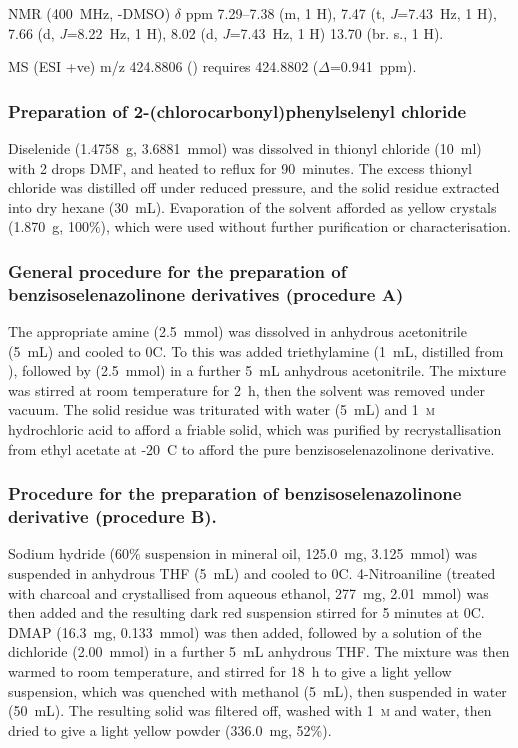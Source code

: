 \begin{refsection}
 NMR (400~MHz, -DMSO) $\delta$ ppm
7.29--7.38 (m, 1 H),
7.47 (t, \emph{J}=7.43~Hz, 1 H),
7.66 (d, \emph{J}=8.22~Hz, 1 H),
8.02 (d, \emph{J}=7.43~Hz, 1 H)
13.70 (br. s., 1 H).

MS (ESI +ve) m/z 424.8806 ()  requires 424.8802 ($\Delta$=0.941~ppm).

\subsubsection[Preparation of \refcmpd{dichloride}]{Preparation of 2-(chlorocarbonyl)phenylselenyl chloride }
Diselenide  (1.4758~g, 3.6881~mmol) was dissolved in thionyl chloride (10~ml) with 2 drops DMF, and heated to reflux for 90~minutes.
The excess thionyl chloride was distilled off under reduced pressure, and the solid residue extracted into dry hexane (30~mL).
Evaporation of the solvent afforded  as yellow crystals (1.870~g, 100\%), which were used without further purification or characterisation.

\subsubsection[General procedure A]{General procedure for the preparation of benzisoselenazolinone derivatives  (procedure A)}
The appropriate amine (2.5~mmol) was dissolved in anhydrous acetonitrile (5~mL) and cooled to 0\degree C.
To this was added triethylamine (1~mL, distilled from ), followed by  (2.5~mmol) in a further 5~mL anhydrous acetonitrile.
The mixture was stirred at room temperature for 2~h, then the solvent was removed under vacuum.
The solid residue was triturated with water (5~mL) and 1~\textsc{m} hydrochloric acid to afford a friable solid, which was purified by recrystallisation from ethyl acetate at -20\degree~C to afford the pure benzisoselenazolinone derivative.

\subsubsection[General procedure B]{Procedure for the preparation of benzisoselenazolinone derivative  (procedure B).}
Sodium hydride (60\% suspension in mineral oil, 125.0~mg, 3.125~mmol) was suspended in anhydrous THF (5~mL) and cooled to 0\degree C.
4-Nitroaniline (treated with charcoal and crystallised from aqueous ethanol, 277~mg, 2.01~mmol) was then added and the resulting dark red suspension stirred for 5 minutes at 0\degree C.
DMAP (16.3~mg, 0.133~mmol) was then added, followed by a solution of the dichloride  (2.00~mmol) in a further 5~mL anhydrous THF.
The mixture was then warmed to room temperature, and stirred for 18~h to give a light yellow suspension, which was quenched with methanol (5~mL), then suspended in water (50~mL).
The resulting solid was filtered off, washed with 1~\textsc{m}  and water, then dried to give a light yellow powder (336.0~mg, 52\%).


\end{refsection}
